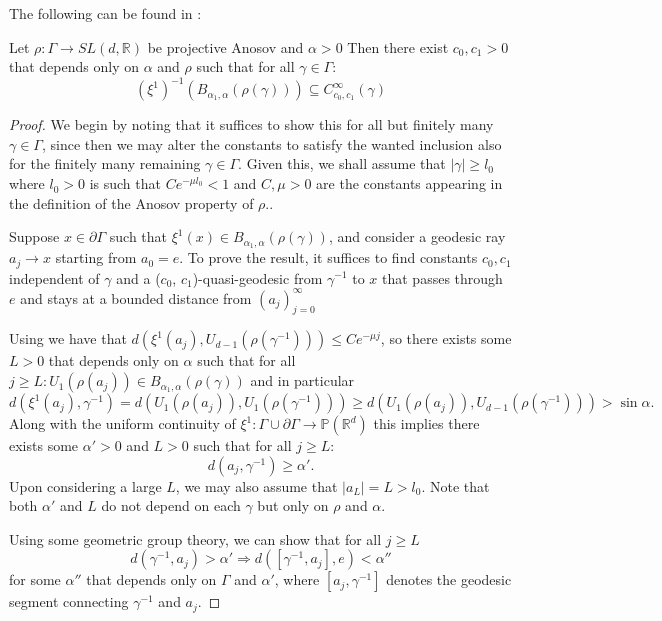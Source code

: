 \documentclass{report}
\begin{document}
The following can be found in \cite[Proposition 3.3]{pozzetti_anosov_2023}:
\begin{proposition}
    Let $\rho: \Gamma \to SL(d, \mathbb R)$ be projective Anosov and $\alpha > 0$
    Then there exist $c_0, c_1 > 0$ that depends only on $\alpha$ and $\rho$ such that for all $\gamma \in \Gamma$:
    \[
        (\xi^1)^{-1}(B_{\alpha_1, \alpha}(\rho(\gamma))) \subseteq C_{c_0,c_1}^\infty(\gamma)
    \]
\end{proposition}
\begin{proof}
    We begin by noting that it suffices to show this for all but finitely many $\gamma \in \Gamma$, since then we may alter the constants to satisfy the wanted inclusion also for the finitely many remaining $\gamma \in \Gamma$. Given this, we shall assume that $|\gamma| \geq l_0$ where $l_0 > 0$ is such that $Ce^{-\mu l_0} < 1$ and $C, \mu > 0$ are the constants appearing in the definition of the Anosov property of $\rho$..

    Suppose $x \in \partial \Gamma$ such that $\xi^1(x) \in B_{\alpha_1, \alpha}(\rho(\gamma))$, and consider a geodesic ray $a_j \to x$ starting from $a_0 = e$.
    To prove the result, it suffices to find constants $c_0, c_1$ independent of $\gamma$ and a ($c_0$, $c_1$)-quasi-geodesic from $\gamma^{-1}$ to $x$ that passes through $e$ and stays at a bounded distance from $(a_j)_{j=0}^\infty$

    Using \cite[Proposition 2.5]{pozzetti_anosov_2023} we have that
    $d(\xi^1(a_j), U_{d-1}(\rho(\gamma^{-1}))) \leq C e^{-\mu j}$, 
    so there exists some $L>0$ that depends only on $\alpha$ 
    such that for all $j\geq L: U_1(\rho(a_j))\in B_{\alpha_1, \alpha}(\rho(\gamma))$ and in particular
    \[
        d(\xi^1(a_j), \gamma^{-1}) = d(U_1(\rho(a_j)), U_1(\rho(\gamma^{-1}))) \geq 
        d(U_1(\rho(a_j)), U_{d-1}(\rho(\gamma^{-1}))) > \sin\alpha.
    \]
    Along with the uniform continuity of $\xi^1: \Gamma \cup \partial \Gamma \to \mathbb P(\mathbb R^d)$ this implies there exists some $\alpha' > 0$ and $L>0$ such that for all $j\geq L$:
    \[
        d(a_j, \gamma^{-1}) \geq \alpha'.
    \]
    Upon considering a large $L$, we may also assume that $|a_L| = L > l_0$. Note that both $\alpha'$ and $L$ do not depend on each $\gamma$ but only on $\rho$ and $\alpha$.

    Using some geometric group theory, we can show that for all $j \geq L$
    \[
        d(\gamma^{-1}, a_j) > \alpha' \Rightarrow
        d([\gamma^{-1}, a_j], e) < \alpha''
    \]
    for some $\alpha''$ that depends only on $\Gamma$ and $\alpha'$, where $[a_j, \gamma^{-1}]$ denotes the geodesic segment connecting $\gamma^{-1}$ and $a_j$.


\end{proof}
\end{document}
